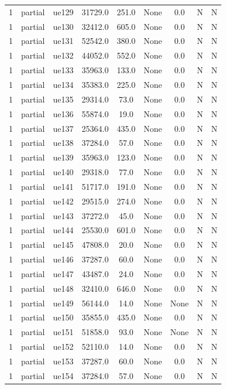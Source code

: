 \begin{table}[ht]
\begin{tabular}{|c|c|c|c|c|c|c|c|c|}
1 & partial & ue129 & 31729.0 & 251.0 & None & 0.0 & N & N \\
1 & partial & ue130 & 32412.0 & 605.0 & None & 0.0 & N & N \\
1 & partial & ue131 & 52542.0 & 380.0 & None & 0.0 & N & N \\
1 & partial & ue132 & 44052.0 & 552.0 & None & 0.0 & N & N \\
1 & partial & ue133 & 35963.0 & 133.0 & None & 0.0 & N & N \\
1 & partial & ue134 & 35383.0 & 225.0 & None & 0.0 & N & N \\
1 & partial & ue135 & 29314.0 & 73.0 & None & 0.0 & N & N \\
1 & partial & ue136 & 55874.0 & 19.0 & None & 0.0 & N & N \\
1 & partial & ue137 & 25364.0 & 435.0 & None & 0.0 & N & N \\
1 & partial & ue138 & 37284.0 & 57.0 & None & 0.0 & N & N \\
1 & partial & ue139 & 35963.0 & 123.0 & None & 0.0 & N & N \\
1 & partial & ue140 & 29318.0 & 77.0 & None & 0.0 & N & N \\
1 & partial & ue141 & 51717.0 & 191.0 & None & 0.0 & N & N \\
1 & partial & ue142 & 29515.0 & 274.0 & None & 0.0 & N & N \\
1 & partial & ue143 & 37272.0 & 45.0 & None & 0.0 & N & N \\
1 & partial & ue144 & 25530.0 & 601.0 & None & 0.0 & N & N \\
1 & partial & ue145 & 47808.0 & 20.0 & None & 0.0 & N & N \\
1 & partial & ue146 & 37287.0 & 60.0 & None & 0.0 & N & N \\
1 & partial & ue147 & 43487.0 & 24.0 & None & 0.0 & N & N \\
1 & partial & ue148 & 32410.0 & 646.0 & None & 0.0 & N & N \\
1 & partial & ue149 & 56144.0 & 14.0 & None & None & N & N \\
1 & partial & ue150 & 35855.0 & 435.0 & None & 0.0 & N & N \\
1 & partial & ue151 & 51858.0 & 93.0 & None & None & N & N \\
1 & partial & ue152 & 52110.0 & 14.0 & None & 0.0 & N & N \\
1 & partial & ue153 & 37287.0 & 60.0 & None & 0.0 & N & N \\
1 & partial & ue154 & 37284.0 & 57.0 & None & 0.0 & N & N \\

\end{tabular}
\end{table}
